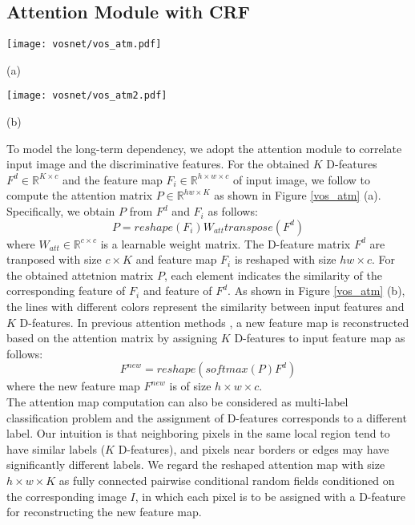 \documentclass[runningheads]{llncs}
\begin{document}
\subsection{Attention Module with CRF}\label{sec_atm}
\begin{figure*}[t!]
	\begin{minipage}[t]{0.65\linewidth} 
		\centering
		\texttt{[image: vosnet/vos\_atm.pdf]}
		\centerline{(a)}
	\end{minipage}
	\begin{minipage}[t]{0.34\linewidth} 
		\centering
		\texttt{[image: vosnet/vos\_atm2.pdf]}
		\centerline{(b)}
	\end{minipage} 
	\caption{(a) Illustration of ATM. The input feature map and $K$ D-features are correlated to model long-term dependency; (b)  Illustration of attention mechanism. The details are presented in Section \ref{sec_atm}.}
	\label{vos_atm}
\end{figure*}
To model the long-term dependency, we adopt the attention module to correlate input image and the discriminative features.  For the obtained $K$ D-features $F^{d} \in \mathbb{R}^{K \times c}$ and the feature map $F_i \in \mathbb{R}^{h \times w \times c}$ of input image, we follow \cite{vos_cosnet,vos_agnn} to compute the attention matrix $P \in \mathbb{R}^{hw \times K}$ as shown in Figure \ref{vos_atm} (a). Specifically, we obtain $P$ from $F^{d}$ and $F_i$ as follows:
\begin{equation}
P = reshape(F_i)W_{att}transpose(F^{d})
\end{equation}
where $W_{att} \in \mathbb{R}^{c \times c}$ is a learnable weight matrix. The  D-feature matrix $F^d$ are tranposed with size $c \times K$ and feature map $F_i$ is reshaped with size $hw \times c$. For the obtained attetnion matrix $P$, each element indicates the similarity of the corresponding feature of $F_i$ and feature of $F^d$. As shown in Figure \ref{vos_atm} (b), the lines with different colors represent the similarity between input features and $K$ D-features. In previous attention methods \cite{vos_cosnet,vos_agnn,vos_andiff}, a new feature map is reconstructed based on the attention matrix by assigning $K$ D-features to input feature map as follows:
\begin{equation}
F^{new} = reshape(softmax(P)F^{d}) \label{new_feature}
\end{equation}
where the new feature map $F^{new}$ is of size $h \times w \times c$. \\
\indent The attention map computation can also be considered as multi-label classification problem and the assignment of  D-features corresponds to a different label. Our intuition is that neighboring pixels in the same local region tend to have similar labels ($K$ D-features), and pixels near borders or edges may have significantly different labels. We regard the reshaped attention map with size $h \times w \times K$ as fully connected pairwise conditional random fields conditioned on the corresponding image $I$, in which each pixel is to be assigned with a D-feature for reconstructing the new feature map.\\
\end{document}
